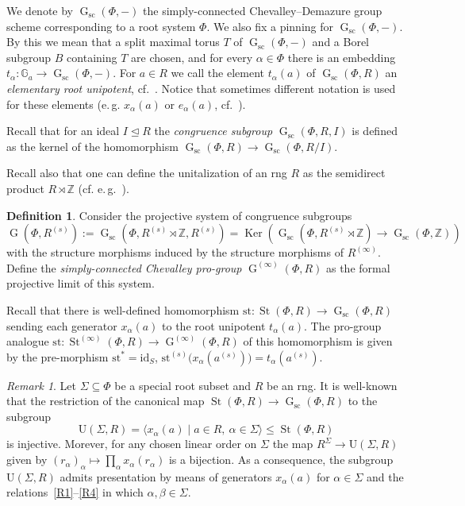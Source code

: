 \documentclass[oneside, 11pt]{amsart}
\numberwithin{equation}{section}
\theoremstyle{definition}
\newtheorem{df}[lemma]{Definition} \Crefname{df}{Definition}{Definitions}
\theoremstyle{remark}
\newtheorem{rem}[lemma]{Remark}
\DeclareMathOperator\St{St}
\DeclareMathOperator\Ker{Ker}
\DeclareMathOperator\GG{G}
\newcommand{\ZZ}{\mathbb{Z}}
\begin{document}
We denote by $\GG_\mathrm{sc}(\Phi,-)$ the simply-connected Chevalley--Demazure group scheme corresponding to a root system $\Phi$.
We also fix a pinning for $\GG_\mathrm{sc}(\Phi,-)$. By this we mean that a split maximal torus $T$ of $\GG_\mathrm{sc}(\Phi,-)$ and a Borel subgroup $B$ containing $T$ are chosen, and for every $\alpha\in\Phi$ there is an embedding $t_\alpha\colon \mathbb{G}_a\to\GG_\mathrm{sc}(\Phi, -)$.
For $a \in R$ we call the element $t_\alpha(a)$ of $\GG_\mathrm{sc}(\Phi, R)$ an {\it elementary root unipotent}, cf.~\cite{VP}. Notice that sometimes different notation is used for these elements (e.\,g. $x_\alpha(a)$ or $e_\alpha(a)$, cf.~\cite{Ma69,St71,VP}).

Recall that for an ideal $I \trianglelefteq R$ the {\it congruence subgroup} $\GG_\mathrm{sc}(\Phi, R, I)$ is defined as 
 the kernel of the homomorphism $\GG_\mathrm{sc}(\Phi, R) \to \GG_\mathrm{sc}(\Phi, R/I)$.

Recall also that one can define the unitalization of an rng $R$ as the semidirect product $R \rtimes \ZZ$ (cf. e.\,g.~\cite[Definition~3.2]{Sin}).
 \begin{df}
Consider the projective system of congruence subgroups
 \[\GG(\Phi, R^{(s)}) := \GG_{\mathrm{sc}}(\Phi, R^{(s)} \rtimes \ZZ, R^{(s)}) = \Ker\left(\GG_{\mathrm{sc}}(\Phi, R^{(s)} \rtimes \ZZ) \to \GG_{\mathrm{sc}}(\Phi, \ZZ)\right)\] with the structure morphisms induced by the structure morphisms of \(R^{(\infty)}\). Define the {\it simply-connected Chevalley pro-group} $\GG^{(\infty)}(\Phi, R)$ as the formal projective limit of this system.
\end{df}

Recall that there is well-defined homomorphism $\mathrm{st}\colon \St(\Phi, R) \to \GG_{\mathrm{sc}}(\Phi, R)$ sending each generator $x_\alpha(a)$ to the root unipotent $t_\alpha(a)$. The pro-group analogue \(\mathrm{st} \colon \St^{(\infty)}(\Phi, R) \to \GG^{(\infty)}(\Phi, R)\) of this homomorphism is given by the pre-morphism \(\mathrm{st}^* = \mathrm{id}_S\), \(\mathrm{st}^{(s)}\bigl(x_{\alpha}(a^{(s)})\bigr) = t_\alpha(a^{(s)})\). 

\begin{rem}\label{rem:uni-rad}
Let $\Sigma \subseteq \Phi$ be a special root subset and $R$ be an rng. It is well-known that the restriction of the canonical map $\St(\Phi, R)\to\GG_{\mathrm{sc}}(\Phi, R)$ to the subgroup \[\mathrm{U}(\Sigma, R) = \langle x_{\alpha}(a) \mid a\in R,\ \alpha\in \Sigma \rangle \leq \St(\Phi, R)\] is injective. Morever, for any chosen linear order on \(\Sigma\) the map $R^{\Sigma} \to \mathrm{U}(\Sigma, R)$ given by $(r_\alpha)_\alpha \mapsto \prod_\alpha x_\alpha(r_\alpha)$ is a bijection. As a consequence, the subgroup $\mathrm{U}(\Sigma, R)$ admits presentation by means of generators $x_\alpha(a)$ for $\alpha \in \Sigma$ and the relations~\eqref{R1}--\eqref{R4} in which $\alpha, \beta \in \Sigma$.
\end{rem}
\end{document}
